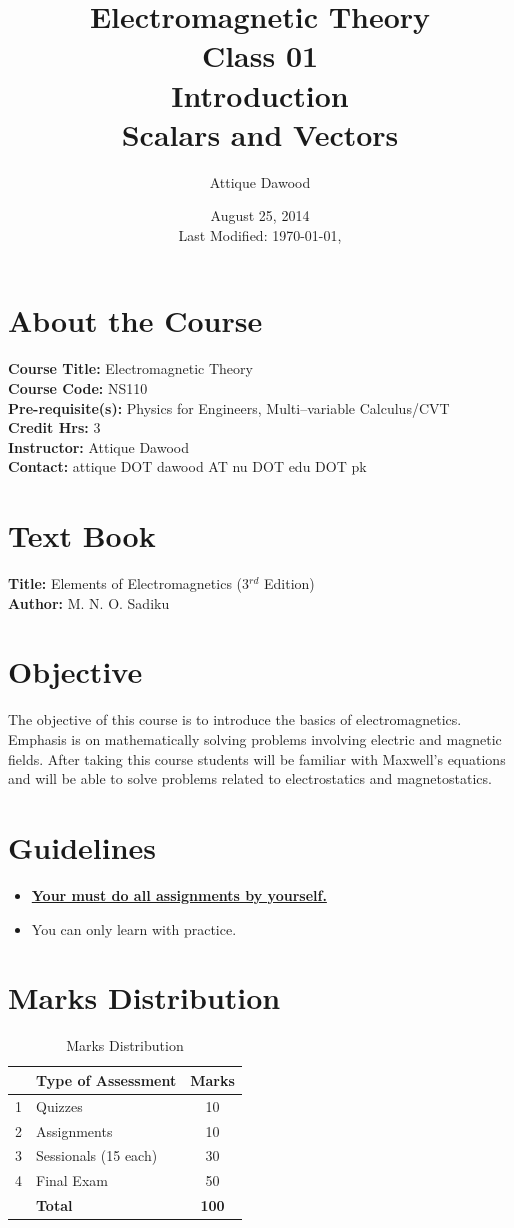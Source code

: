 \documentclass[12pt,a4paper]{article}
\title{Electromagnetic Theory\\Class 01\\Introduction\\Scalars and Vectors}
\author{Attique Dawood}
\date{August 25, 2014\\[0.2cm] Last Modified: \today, \currenttime}
\begin{document}
\maketitle
\section{About the Course}
\textbf{Course Title:} Electromagnetic Theory\\
\textbf{Course Code:} NS110\\
\textbf{Pre-requisite(s):} Physics for Engineers, Multi--variable Calculus/CVT\\
\textbf{Credit Hrs:} 3\\
\textbf{Instructor:} Attique Dawood\\
\textbf{Contact:} attique DOT dawood AT nu DOT edu DOT pk\\
\section{Text Book}
\textbf{Title:} Elements of Electromagnetics (3$^{rd}$ Edition)\\
\textbf{Author:} M. N. O. Sadiku\\
\section{Objective}
The objective of this course is to introduce the basics of electromagnetics. Emphasis is on mathematically solving problems involving electric and magnetic fields. After taking this course students will be familiar with Maxwell's equations and will be able to solve problems related to electrostatics and magnetostatics.
\section{Guidelines}
\begin{itemize}
\item \textbf{\underline{Your must do all assignments by yourself.}}
\item You can only learn with practice.
\end{itemize}
\section{Marks Distribution}
\begin{table}[H]
\begin{center}
\vspace{0.3cm}
	\begin{tabular}{llc}
	\hline \hline
		\rule{0pt}{2.6ex} & \textbf{Type of Assessment} & \textbf{Marks}\\
		\hline
		1 \rule{0pt}{2.6ex} & Quizzes & 10\\
		2 & Assignments& 10\\
		3 & Sessionals (15 each) & 30\\
		4 & Final Exam & 50\\
	\hline \hline
	\rule{0pt}{2.6ex} & \textbf{Total} & \textbf{100}\\
	\hline \hline
	\end{tabular}
\end{center}
\label{Marks Distribution}
\caption{Marks Distribution}
\end{table}
\end{document}
